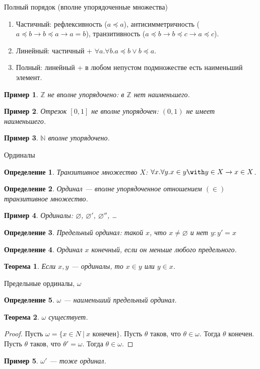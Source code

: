 \documentclass[aspectratio=169]{beamer}
\newtheorem{thm}{Теорема}[section]
\newtheorem{dfn}{Определение}[section]
\newtheorem{exm}{Пример}[section]
\begin{document}
\begin{frame}{Полный порядок (вполне упорядоченные множества)}
\begin{enumerate}
\item Частичный: рефлексивность ($a \preceq a$), антисимметричность ($a \preceq b \rightarrow b \preceq a\rightarrow a=b$),
транзитивность ($a \preceq b \rightarrow b \preceq c \rightarrow a \preceq c$).\pause
\item Линейный: частичный + $\forall a.\forall b.a \preceq b \vee b \preceq a$.\pause
\item Полный: линейный + в любом непустом подмножестве есть наименьший элемент.\pause
\end{enumerate}

\begin{exm}$\mathbb{Z}$ не вполне упорядочено: в $\mathbb{Z}$ нет наименьшего.\end{exm}\pause
\begin{exm}Отрезок $[0,1]$ не вполне упорядочен: $(0,1)$ не имеет наименьшего.\end{exm}\pause
\begin{exm}$\mathbb{N}$ вполне упорядочено.\end{exm}
\end{frame}

\begin{frame}{Ординалы}
\begin{dfn}Транзитивное множество $X$: $\forall x.\forall y.x \in y \with y \in X \rightarrow x \in X$.\end{dfn}\pause
\begin{dfn}Ординал --- вполне упорядоченное отношением $(\in)$ транзитивное множество.\end{dfn}\pause
\begin{exm}Ординалы: $\varnothing$, \pause $\varnothing'$, \pause $\varnothing''$, \dots\end{exm}\pause
\begin{dfn}Предельный ординал: такой $x$, что $x \ne \varnothing$ и нет $y: y' = x$\end{dfn}\pause
\begin{dfn}Ординал $x$ конечный, если он меньше любого предельного.\end{dfn}\pause
\begin{thm}Если $x,y$ --- ординалы, то $x\in y$ или $y \in x$.\end{thm}
\end{frame}
\begin{frame}{Предельные ординалы, $\omega$}
\begin{dfn}$\omega$ --- наименьший предельный ординал.\end{dfn}\pause
\begin{thm}$\omega$ существует.\end{thm}\pause
\begin{proof}Пусть $\omega = \{ x \in N\ |\ x\text{ конечен}\}$. 
Пусть $\theta$ таков, что $\theta \in \omega$. Тогда $\theta$ конечен. \pause
Пусть $\theta$ таков, что $\theta' = \omega$. Тогда $\theta \in \omega$.\end{proof}
\begin{exm}$\omega'$ --- тоже ординал.\end{exm}
\end{frame}
\end{document}
